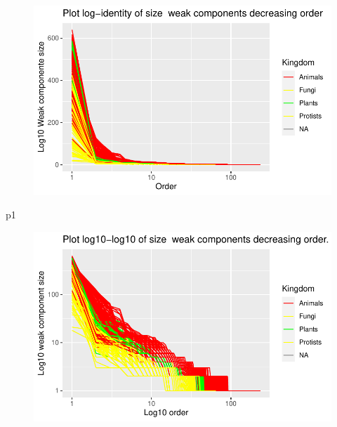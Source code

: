 \documentclass[
  letterpaper,
  DIV=11,
  numbers=noendperiod]{scrreprt}
\newenvironment{Shaded}{}{}
\newcommand{\NormalTok}[1]{\textcolor[rgb]{0.67,0.70,0.75}{#1}}
\begin{document}
\begin{figure}[H]

{\centering \includegraphics[width=1\textwidth,height=\textheight]{index_files/figure-pdf/unnamed-chunk-29-1.pdf}

}

\end{figure}

\begin{Shaded}
\begin{Highlighting}[]
\NormalTok{p1}
\end{Highlighting}
\end{Shaded}

\begin{figure}[H]

{\centering \includegraphics[width=1\textwidth,height=\textheight]{index_files/figure-pdf/unnamed-chunk-29-2.pdf}

}

\end{figure}
\end{document}
